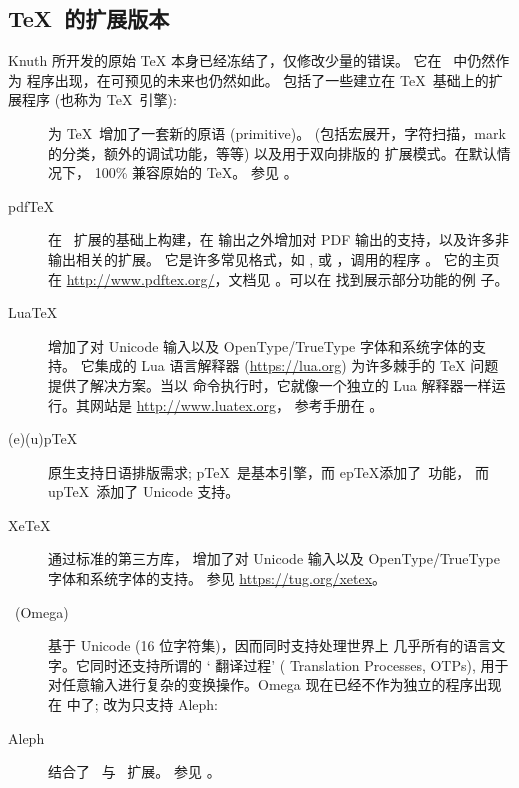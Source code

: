 \documentclass{article}
\begin{document}
\subsection{\protect\TeX\ 的扩展版本}
\label{sec:tex-extensions}

Knuth 所开发的原始 \TeX{} 本身已经冻结了，仅修改少量的错误。
它在 \TL\ 中仍然作为  程序出现，在可预见的未来也仍然如此。
\TL{} 包括了一些建立在 \TeX\ 基础上的扩展程序 (也称为 \TeX\ 引擎): 

\begin{description}

\item [\eTeX] 为 \TeX\ 增加了一套新的原语 (primitive)。
\label{text:etex} (包括宏展开，字符扫描，mark 的分类，额外的调试功能，等等)
以及用于双向排版的 \TeXXeT{} 扩展模式。在默认情况下，\eTeX{} 100\% 兼容原始的 \TeX。
参见 。

\item [pdf\TeX] 在 \eTeX\ 扩展的基础上构建，在 \dvi{} 输出之外增加对
PDF 输出的支持，以及许多非输出相关的扩展。
它是许多常见格式，如 ,  或 ，调用的程序 。
它的主页在 \url{http://www.pdftex.org/}，文档见
。可以在
 找到展示部分功能的例
子。

\item  [Lua\TeX] 增加了对 Unicode 输入以及 OpenType/TrueType 字体和系统字体的支持。
它集成的 Lua 语言解释器 (\url{https://lua.org}) 为许多棘手的 \TeX{}
问题提供了解决方案。当以  命令执行时，它就像一个独立的
Lua 解释器一样运行。其网站是 \url{http://www.luatex.org}，
参考手册在 。

\item [(e)(u)p\TeX] 原生支持日语排版需求; 
p\TeX\ 是基本引擎，而 ep\TeX 添加了\eTeX\ 功能，
而 up\TeX\ 添加了 Unicode 支持。

\item [Xe\TeX] 通过标准的第三方库，
增加了对 Unicode 输入以及 OpenType/TrueType 字体和系统字体的支持。
参见 \url{https://tug.org/xetex}。

\item [\OMEGA\ (Omega)] 基于 Unicode (16 位字符集)，因而同时支持处理世界上
几乎所有的语言文字。它同时还支持所谓的 `\OMEGA{} 翻译过程'
(\OMEGA{} Translation Processes, OTPs),
用于对任意输入进行复杂的变换操作。Omega 现在已经不作为独立的程序出现在 \TL{}
中了; 改为只支持 Aleph: 

\item [Aleph] 结合了 \OMEGA\ 与 \eTeX\ 扩展。
参见 。

\end{description}
\end{document}
